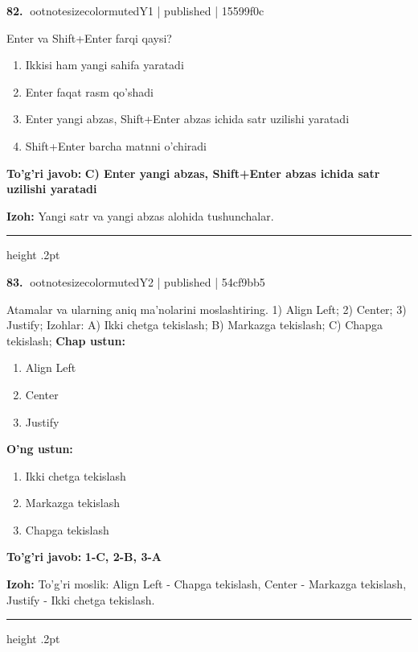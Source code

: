 \documentclass[10pt,a4paper]{article}
\begin{document}
\textbf{\color{ink}82.} {ootnotesizecolor{muted}Y1 | published | 15599f0c}
\par
Enter va Shift+Enter farqi qaysi?
\begin{enumerate}[label=\Alph*),leftmargin=9mm]
\item Ikkisi ham yangi sahifa yaratadi
\item Enter faqat rasm qo'shadi
\item Enter yangi abzas, Shift+Enter abzas ichida satr uzilishi yaratadi
\item Shift+Enter barcha matnni o'chiradi
\end{enumerate}
\begin{tcolorbox}[enhanced,breakable,colback=teal!4,colframe=teal!55!black,boxrule=0.45pt,arc=1.2mm,left=2.8mm,right=2.8mm,top=2mm,bottom=2mm]
\textbf{\color{teal}To'g'ri javob:} \textbf{C) Enter yangi abzas, Shift+Enter abzas ichida satr uzilishi yaratadi}
\par\smallskip
\textbf{Izoh:} Yangi satr va yangi abzas alohida tushunchalar.
\end{tcolorbox}
\vspace{2mm}\hrule height .2pt\vspace{2mm}

\textbf{\color{ink}83.} {ootnotesizecolor{muted}Y2 | published | 54cf9bb5}
\par
Atamalar va ularning aniq ma'nolarini moslashtiring.  1) Align Left;  2) Center;  3) Justify;  Izohlar: A) Ikki chetga tekislash;  B) Markazga tekislash;  C) Chapga tekislash;
\textbf{Chap ustun:}\begin{enumerate}[label=\arabic*),leftmargin=9mm]
\item Align Left
\item Center
\item Justify
\end{enumerate}
\textbf{O'ng ustun:}\begin{enumerate}[label=\Alph*),leftmargin=9mm]
\item Ikki chetga tekislash
\item Markazga tekislash
\item Chapga tekislash
\end{enumerate}
\begin{tcolorbox}[enhanced,breakable,colback=teal!4,colframe=teal!55!black,boxrule=0.45pt,arc=1.2mm,left=2.8mm,right=2.8mm,top=2mm,bottom=2mm]
\textbf{\color{teal}To'g'ri javob:} \textbf{1-C, 2-B, 3-A}
\par\smallskip
\textbf{Izoh:} To'g'ri moslik: Align Left - Chapga tekislash, Center - Markazga tekislash, Justify - Ikki chetga tekislash.
\end{tcolorbox}
\vspace{2mm}\hrule height .2pt\vspace{2mm}
\end{document}
